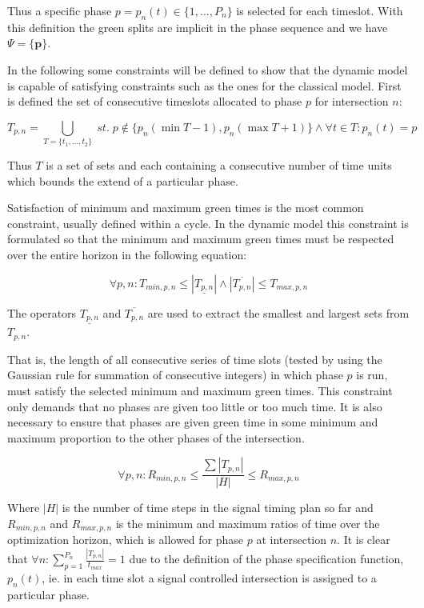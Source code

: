Thus a specific phase $p = p_n(t) \in \lbrace 1,...,P_n \rbrace$ is selected for each timeslot. With this definition the green splits are implicit in the phase sequence and we have $\Psi = \lbrace \textbf{p} \rbrace $.

In the following some constraints will be defined to show that the dynamic model is capable of satisfying constraints such as the ones for the classical model. First is defined the set of consecutive timeslots allocated to phase $p$ for intersection $n$:

\begin{equation}
T_{p,n} = \bigcup_{T = \lbrace t_1,...,t_2 \rbrace} \; st. \; p \not \in \lbrace p_n(\min T - 1), p_n(\max T + 1) \rbrace \wedge\forall t \in T: p_n(t) = p 
\end{equation}

Thus $T$ is a set of sets and each containing a consecutive number of time units which bounds the extend of a particular phase.

Satisfaction of minimum and maximum green times is the most common constraint, usually defined within a cycle. In the dynamic model this constraint is formulated so that the minimum and maximum green times must be respected over the entire horizon in the following equation:

\begin{equation}
\label{eqn:minmaxtimes}
\forall p,n : T_{min,p,n} \leq |\underline{T_{p,n}}| \wedge |\overline{T_{p,n}}| \leq T_{max,p,n} 
\end{equation}

The operators $\underline{T_{p,n}}$ and $\overline{T_{p,n}}$ are used to extract the smallest and largest sets from $T_{p,n}$.

That is, the length of all consecutive series of time slots (tested by using the Gaussian rule for summation of consecutive integers) in which phase $p$ is run, must satisfy the selected minimum and maximum green times. This constraint only demands that no phases are given too little or too much time. It is also necessary to ensure that phases are given green time in some minimum and maximum proportion to the other phases of the intersection.

\begin{equation}
\label{eqn:proportions}
\forall p,n : R_{min,p,n} \leq \frac{\sum |T_{p,n}|}{|H|} \leq R_{max,p,n}
\end{equation}

Where $|H|$ is the number of time steps in the signal timing plan so far and $R_{min,p,n}$ and $R_{max,p,n}$ is the minimum and maximum ratios of time over the optimization horizon, which is allowed for phase $p$ at intersection $n$. It is clear that $\forall n : \displaystyle\sum_{p=1}^{P_n}\frac{|T_{p,n}|}{t_{max}} = 1$ due to the definition of the phase specification function, $p_n(t)$,  ie. in each time slot a signal controlled intersection is assigned to a particular phase.

